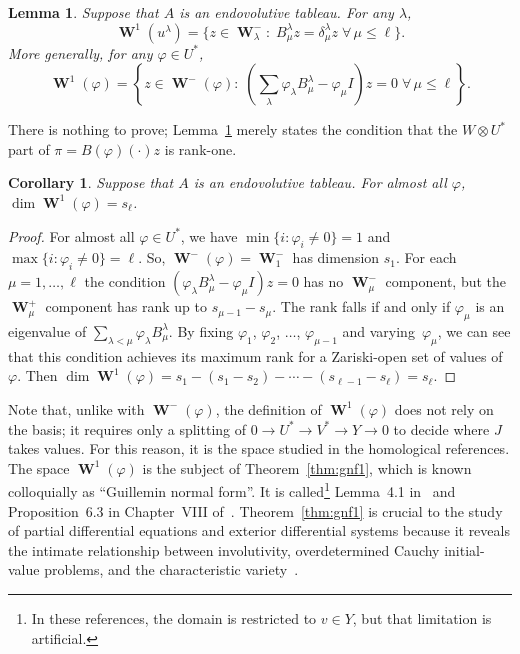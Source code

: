 \documentclass[pdftex]{sigma}
\numberwithin{equation}{section}
\newtheorem{Corollary}[Theorem]{Corollary}
\newtheorem{Lemma}[Theorem]{Lemma}
{\theoremstyle{definition}
\newtheorem{Definition}[Theorem]{Definition} }
\DeclareMathOperator{\Wu}{\mathbf{W}}
\begin{document}
\begin{Lemma}\label{lem:Wup}
Suppose that $A$ is an endovolutive tableau.
For any $\lambda$,
\[
\Wu^1(u^\lambda) = \big\{
z \in \Wu^-_\lambda\colon \; B^\lambda_\mu z = \delta^\lambda_\mu z \; \forall \,\mu
\leq \ell\big\}.
\]
More generally, for any $\varphi \in U^*$,
\[
\Wu^1(\varphi) = \left\{
z \in \Wu^-(\varphi)\colon \;
\left( \sum_\lambda \varphi_\lambda B^\lambda_\mu - \varphi_\mu I  \right) z = 0\;
 \forall \, \mu
\leq \ell
\right\}.
\]
\end{Lemma}

There is nothing to prove; Lemma~\ref{lem:Wup} merely states the condition that the $W \otimes U^*$ part of
$\pi=B(\varphi)(\cdot)z$ is rank-one.
\begin{Corollary}
Suppose that $A$ is an endovolutive tableau.
For almost all $\varphi$, $\dim \Wu^1(\varphi) = s_\ell$.
\label{cor:dimW1}
\end{Corollary}

\begin{proof}
For almost all $\varphi \in U^*$, we have $\min \{ i\colon \varphi_i \neq 0 \} = 1$
and $\max \{ i\colon  \varphi_i \neq 0 \} = \ell$.
So, $\Wu^-(\varphi) = \Wu^-_1$ has dimension $s_1$. For each $\mu=1,\ldots,\ell$
the condition $ ( \varphi_\lambda B^\lambda_\mu - \varphi_\mu
I   ) z = 0$ has no $\Wu^-_\mu$ component, but the
$\Wu^+_\mu$ component has rank up to $s_{\mu-1} - s_{\mu}$.  The rank falls if
and only if
$\varphi_\mu$ is an eigenvalue of $\sum\limits_{\lambda < \mu} \varphi_\lambda
B^\lambda_\mu$.  By f\/ixing $\varphi_1$, $\varphi_2$,
$\ldots$, $\varphi_{\mu-1}$ and varying~$\varphi_\mu$, we can see that this
condition achieves its maximum rank for a Zariski-open set of values of
$\varphi$. Then
$\dim \Wu^1(\varphi) = s_1 - (s_1-s_2) -  \cdots - (s_{\ell-1} -
s_{\ell}) = s_\ell$.
\end{proof}

Note that, unlike with $\Wu^-(\varphi)$, the def\/inition of $\Wu^1(\varphi)$
does not rely on the basis; it requires only a splitting of $0 \to U^* \to V^*
\to Y \to 0$ to decide where $J$ takes values.  For this
reason, it is the space studied in the homological references.
The space $\Wu^1(\varphi)$ is the subject of Theorem~\ref{thm:gnf1},
which is known colloquially as ``Guillemin normal form''.
It is called\footnote{In these references, the domain is restricted to $v \in Y$, but that limitation is artif\/icial.} Lemma~4.1 in~\cite{Guillemin1968} and Proposition~6.3 in Chapter~VIII of~\cite{BCGGG}.
Theorem~\ref{thm:gnf1} is crucial to the study of partial
dif\/ferential equations and exterior dif\/ferential systems because it reveals the intimate
relationship between involutivity, overdetermined Cauchy initial-value
problems, and the characteristic variety~\cite{Guillemin1970}.
\end{document}
